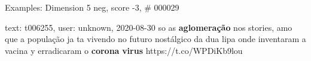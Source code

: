 \begin{frame}{Examples: Dimension 5 neg, score -3, \# 000029}
\footnotesize
\begin{alertblock}{text: t006255, user: unknown, 2020-08-30}
so as \textbf{aglomeração} nos stories, amo que a população ja ta vivendo no 
futuro nostálgico da dua lipa onde inventaram a vacina y erradicaram o 
\textbf{corona} \textbf{virus} https://t.co/WPDiKb9lou 
\end{alertblock}
\end{frame}
